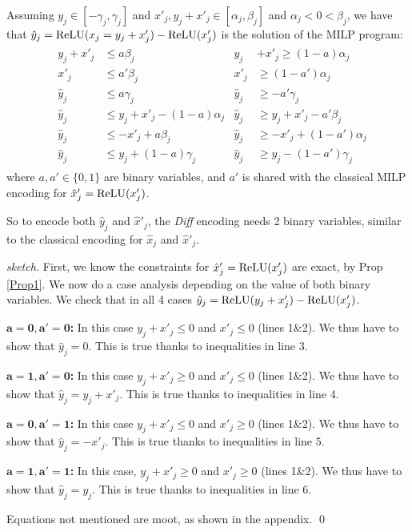 \begin{proposition}
    \label{Prop2}
Assuming $y_j \in [-\gamma_j, \gamma_j]$ and $x'_j,y_j+x'_j \in [\alpha_j,\beta_j]$ and $\alpha_j<0<\beta_j$, we have that $\hat{y}_j = \mathrm{ReLU}(x_j=y_j + x'_j) - \mathrm{ReLU}(x'_j)$ is the solution of the MILP program:
	\begin{align*}
		& \begin{aligned}
			y_j + x'_j &\leq a\beta_j        &
			y_j &+ x'_j \geq (1-a)\alpha_j \\
			x'_j       &\leq a'\beta_j       & 
			x'_j       &\geq (1-a')\alpha_j \\
			\hat{y}_j  &\leq a\gamma_j       &
			\hat{y}_j  &\geq -a'\gamma_j \\
			\hat{y}_j  &\leq y_j + x'_j - (1-a)\alpha_j &
			\hat{y}_j  &\geq y_j + x'_j - a'\beta_j \\
			\hat{y}_j  &\leq -x'_j + a\beta_j &
			\hat{y}_j  &\geq -x'_j + (1-a')\alpha_j \\
			\hat{y}_j  &\leq y_j + (1-a)\gamma_j  &
			\hat{y}_j  &\geq y_j - (1-a')\gamma_j
		\end{aligned}
	\end{align*} 
    where $a,a' \in \{0,1\}$ are binary variables, 
    and $a'$ is shared with the classical MILP
    encoding for $\hat{x}'_j=\mathrm{ReLU}(x'_j)$.
\end{proposition}

So to encode both $\hat{y}_j$ and $\hat{x}'_j$, the {\em Diff} encoding needs 2 binary variables, similar to the classical encoding for $\hat{x}_j$ and $\hat{x}'_j$. 

\begin{proof}[sketch]
First, we know the constraints for $\hat{x}_j'=\mathrm{ReLU}(x_j')$ are exact, by Prop \ref{Prop1}. We now do a case analysis depending on the value of both binary variables. 
 We check that in all 4 cases $\hat{y}_j = \mathrm{ReLU}(y_j+x'_j)-\mathrm{ReLU}(x'_j)$.

\textbf{$\mathbf{a = 0, a' = 0}$:}  In this case $y_j+x'_j\leq 0$ and $x'_j \leq 0 $ (lines 1\&2). We thus have to show that 
$\hat{y}_j = 0$. This is true thanks to inequalities in line 3.

\textbf{$\mathbf{a = 1, a' = 0}$:}  In this case $y_j+x'_j\geq 0$ and $x'_j \leq 0$ (lines 1\&2). We thus have to show that 
$\hat{y}_j = y_j+x'_j$. This is true thanks to inequalities in line 4.

\textbf{$\mathbf{a = 0, a' = 1}$:}  In this case $y_j+x'_j\leq 0$ and
$x'_j \geq 0 $ (lines 1\&2). We thus have to show that 
$\hat{y}_j = -x'_j$. This is true thanks to inequalities in line 5.

\textbf{$\mathbf{a = 1, a' = 1}$:} 
In this case, $y_j+x'_j\geq 0$ and $x'_j \geq 0 $ (lines 1\&2). We thus have to show that $\hat{y}_j = y_j$. This is true thanks to inequalities in line 6.

Equations not mentioned are moot, as shown in the appendix.
	\qed
\end{proof}


